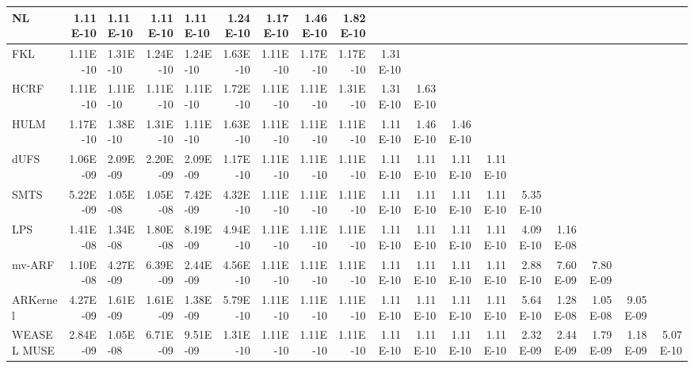 \documentclass[preprint,12pt,3p]{elsarticle}
\begin{document}
\begin{table*}[htpb]
\begin{adjustbox}{width=1 \textwidth, totalheight = 2.3in}
\begin{tabularx}{1.8 \textwidth}{|q|r|q|r|q|r|r|r|r|r|r|r|r|r|r|r|r|r|}
    \hline
    NL    & 1.11E-10 & 1.11E-10 & 1.11E-10 & 1.11E-10 & 1.24E-10 & 1.17E-10 & 1.46E-10 & 1.82E-10 &       &       &       &       &       &       &       &       &  \\
    \hline
    FKL   & 1.11E-10 & 1.31E-10 & 1.24E-10 & 1.24E-10 & 1.63E-10 & 1.11E-10 & 1.17E-10 & 1.17E-10 & 1.31E-10 &       &       &       &       &       &       &       &  \\
    \hline
    HCRF  & 1.11E-10 & 1.11E-10 & 1.11E-10 & 1.11E-10 & 1.72E-10 & 1.11E-10 & 1.11E-10 & 1.31E-10 & 1.31E-10 & 1.63E-10 &       &       &       &       &       &       &  \\
    \hline
    HULM  & 1.17E-10 & 1.38E-10 & 1.31E-10 & 1.11E-10 & 1.63E-10 & 1.11E-10 & 1.11E-10 & 1.11E-10 & 1.11E-10 & 1.46E-10 & 1.46E-10 &       &       &       &       &       &  \\
    \hline
    dUFS  & 1.06E-09 & 2.09E-09 & 2.20E-09 & 2.09E-09 & 1.17E-10 & 1.11E-10 & 1.11E-10 & 1.11E-10 & 1.11E-10 & 1.11E-10 & 1.11E-10 & 1.11E-10 &       &       &       &       &  \\
    \hline
    SMTS  & 5.22E-09 & 1.05E-08 & 1.05E-08 & 7.42E-09 & 4.32E-10 & 1.11E-10 & 1.11E-10 & 1.11E-10 & 1.11E-10 & 1.11E-10 & 1.11E-10 & 1.11E-10 & 5.35E-10 &       &       &       &  \\
    \hline
    LPS   & 1.41E-08 & 1.34E-08 & 1.80E-08 & 8.19E-09 & 4.94E-10 & 1.11E-10 & 1.11E-10 & 1.11E-10 & 1.11E-10 & 1.11E-10 & 1.11E-10 & 1.11E-10 & 4.09E-10 & 1.16E-08 &       &       &  \\
    \hline
    mv-ARF & 1.10E-08 & 4.27E-09 & 6.39E-09 & 2.44E-09 & 4.56E-10 & 1.11E-10 & 1.11E-10 & 1.11E-10 & 1.11E-10 & 1.11E-10 & 1.11E-10 & 1.11E-10 & 2.88E-10 & 7.60E-09 & 7.80E-09 &       &  \\
    \hline
    ARKernel & 4.27E-09 & 1.61E-09 & 1.61E-09 & 1.38E-09 & 5.79E-10 & 1.11E-10 & 1.11E-10 & 1.11E-10 & 1.11E-10 & 1.11E-10 & 1.11E-10 & 1.11E-10 & 5.64E-10 & 1.28E-08 & 1.05E-08 & 9.05E-09 &  \\
    \hline
    WEASEL MUSE & 2.84E-09 & 1.05E-08 & 6.71E-09 & 9.51E-09 & 1.31E-10 & 1.11E-10 & 1.11E-10 & 1.11E-10 & 1.11E-10 & 1.11E-10 & 1.11E-10 & 1.11E-10 & 2.32E-09 & 2.44E-09 & 1.79E-09 & 1.18E-09 & 5.07E-10 \\
    \hline


\end{tabularx}
\end{adjustbox}

\end{table*} 
\end{document}
